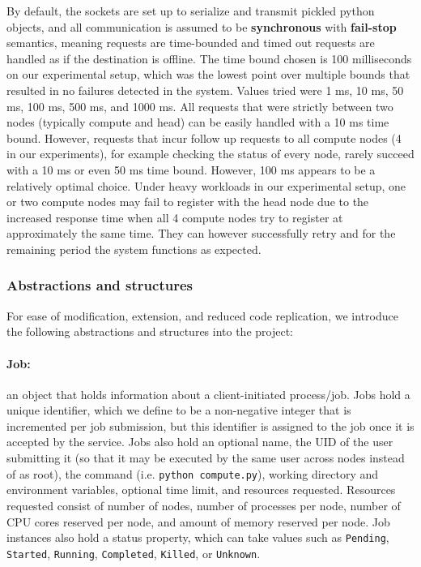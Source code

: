 \documentclass[sigconf]{acmart}
\begin{document}
By default, the sockets are set up to serialize and transmit pickled python objects, and all communication is assumed to be
\textbf{synchronous} with \textbf{fail-stop} semantics, meaning requests are time-bounded and timed out requests are handled as
if the destination is offline.
The time bound chosen is 100 milliseconds on our experimental setup, which was the lowest point over multiple bounds that
resulted in no failures detected in the system. Values tried were 1 ms, 10 ms, 50 ms, 100 ms, 500 ms, and 1000 ms.
All requests that were strictly between two nodes (typically compute and head) can be easily handled with a 10 ms time bound.
However, requests that incur follow up requests to all compute nodes (4 in our experiments), for example checking the status of
every node, rarely succeed with a 10 ms or even 50 ms time bound. However, 100 ms appears to be a relatively optimal choice.
Under heavy workloads in our experimental setup, one or two compute nodes may fail to register with the head node due to the
increased response time when all 4 compute nodes try to register at approximately the same time. They can however successfully
retry and for the remaining period the system functions as expected.

\subsubsection{Abstractions and structures}
For ease of modification, extension, and reduced code replication, we introduce the following abstractions and structures into
the project:

\paragraph{Job:} an object that holds information about a client-initiated process/job.
Jobs hold a unique identifier, which we define to be a non-negative integer that is incremented per job submission,
but this identifier is assigned to the job once it is accepted by the service.
Jobs also hold an optional name, the UID of the user submitting it (so that it may be executed by the same user across nodes
instead of as root), the command (i.e. \verb|python compute.py|), working directory and environment variables, optional time
limit, and resources requested.
Resources requested consist of number of nodes, number of processes per node, number of CPU cores reserved per node, and amount
of memory reserved per node.
Job instances also hold a status property, which can take values such as \verb|Pending|, \verb|Started|, \verb|Running|,
\verb|Completed|, \verb|Killed|, or \verb|Unknown|.
\end{document}
